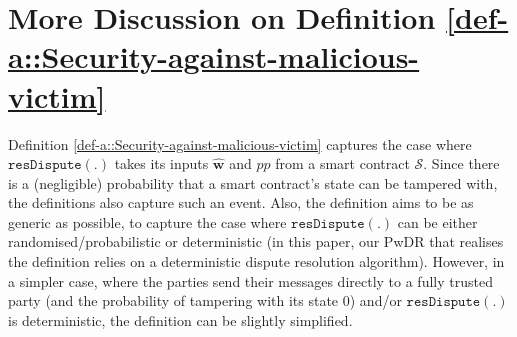 \vspace{-3mm}
\section{More Discussion on Definition \ref{def-a::Security-against-malicious-victim}}\label{sec::Further-Discussion-on-Definition-Sec-against-victim}
\vspace{-1mm}

Definition  \ref{def-a::Security-against-malicious-victim}
%
 captures the case where $\mathtt{resDispute}(.)$ takes its inputs $\hat{\bm w}$ and  $pp$  from a smart contract $\mathcal{S}$. Since there is a (negligible) probability that a smart contract’s state can be tampered with, the definitions also capture such an event. 
 Also, the definition aims to be as generic as possible, to capture the case where $\mathtt{resDispute}(.)$ can be either randomised/probabilistic or deterministic (in this paper, our PwDR that realises the definition relies on a deterministic dispute resolution algorithm). 
 However, in a simpler case, where the parties send their messages directly to a  fully trusted party (and the probability of tampering with its state $0$) and/or $\mathtt{resDispute}(.)$ is deterministic, the definition can be slightly simplified. 












